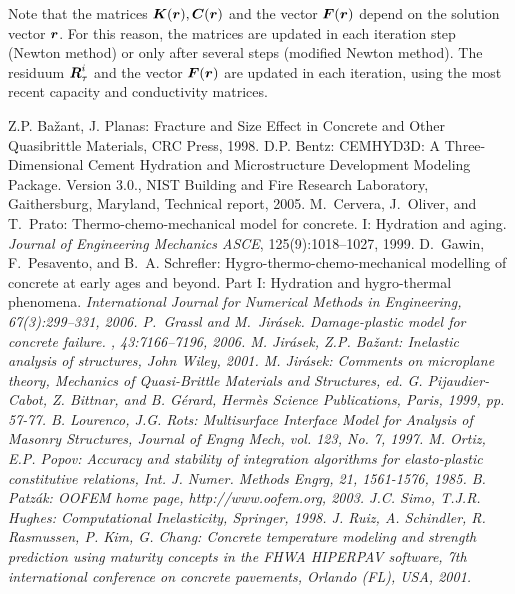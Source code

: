 \documentclass[a4paper]{article}
\newcommand{\mbf}[1]{\mbox{\boldmath$#1$}}
\begin{document}
Note that the matrices $\mbf{K}(\mbf{r}), \mbf{C}(\mbf{r})$ and the vector $\mbf{F}(\mbf{r})$ depend on the solution vector $\mbf{r}$. For this reason, the matrices are updated in each iteration step (Newton method) or only after several steps (modified Newton method). The residuum $\mbf{R}_\tau^{i}$ and the vector $\mbf{F}(\mbf{r})$ are updated in each iteration, using the most recent capacity and conductivity matrices.

\begin{thebibliography}{99}
 Z.P. Ba\v{z}ant, J. Planas: Fracture and Size Effect in Concrete and Other Quasibrittle  Materials, CRC Press, 1998.
 D.P. Bentz: CEMHYD3D: A Three-Dimensional Cement Hydration and Microstructure Development Modeling Package. Version 3.0., NIST Building and Fire Research Laboratory, Gaithersburg, Maryland, Technical report, 2005.
 M.~Cervera, J.~Oliver, and T.~Prato: Thermo-chemo-mechanical model for concrete. I: Hydration and aging. {\em Journal of Engineering Mechanics ASCE}, 125(9):1018--1027, 1999.
 D.~Gawin, F.~Pesavento, and B.~A. Schrefler: Hygro-thermo-chemo-mechanical modelling of concrete at early ages and beyond. Part I: Hydration and hygro-thermal phenomena. \em {International Journal for Numerical Methods in Engineering}, 67(3):299--331, 2006.
 P.~Grassl and M.~Jir\'{a}sek.
\newblock Damage-plastic model for concrete failure.
, 43:7166--7196, 2006.
 M. Jir\'asek, Z.P. Ba\v zant: Inelastic analysis of structures, John Wiley, 2001.
 M. Jir\'{a}sek: Comments on microplane theory, Mechanics of Quasi-Brittle Materials and Structures, ed. G. Pijaudier-Cabot, Z. Bittnar, and B. G\'{e}rard, Herm\`{e}s Science Publications, Paris, 1999, pp. 57-77.
 B. Lourenco, J.G. Rots: Multisurface Interface Model for Analysis of Masonry Structures, Journal of Engng Mech, vol. 123, No. 7, 1997.
 M. Ortiz, E.P. Popov: Accuracy and stability of integration algorithms for elasto-plastic constitutive relations, Int. J. Numer. Methods Engrg, 21, 1561-1576, 1985.
 B. Patz\'ak: OOFEM home page, http://www.oofem.org, 2003.
 J.C. Simo, T.J.R. Hughes: Computational Inelasticity, Springer, 1998.
 J. Ruiz, A. Schindler, R. Rasmussen, P. Kim, G. Chang: Concrete temperature modeling and strength prediction using maturity concepts in the FHWA HIPERPAV software, 7th international conference on concrete pavements, Orlando (FL), USA, 2001.

\end{thebibliography}
\end{document}
